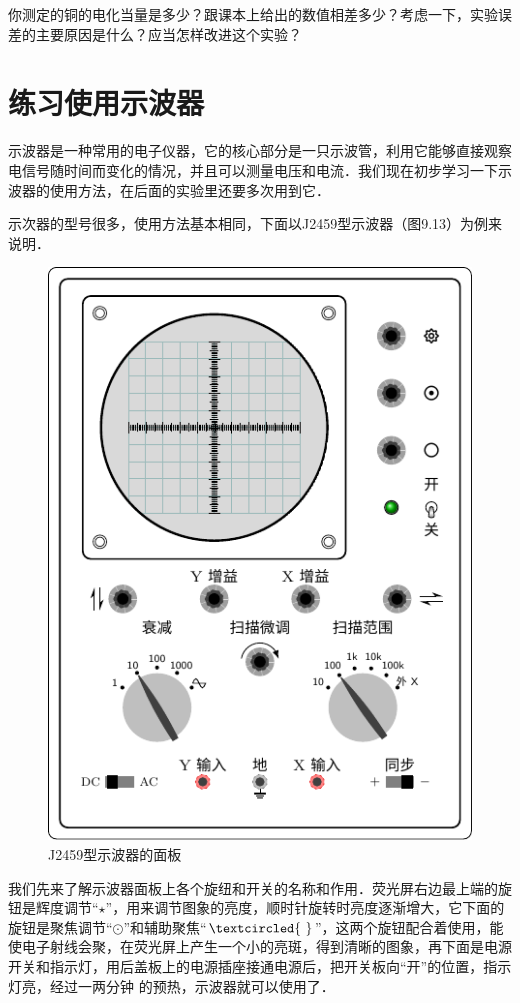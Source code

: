 你测定的铜的电化当量是多少？跟课本上给出的数值相差多少？考虑一下，实验误差的主要原因是什么？应当怎样改进这个实验？

\section{练习使用示波器}
示波器是一种常用的电子仪器，它的核心部分是一只示波管，利用它能够直接观察电信号随时间而变化的情况，并且可以测量电压和电流．我们现在初步学习一下示波器的使用方法，在后面的实验里还要多次用到它．

示次器的型号很多，使用方法基本相同，下面以J2459型示波器（图9.13）为例来说明．
\begin{figure}[htbp]
    \centering
    \includegraphics{fig/B/9-13.pdf}
    \caption{J2459型示波器的面板}\label{fig_B_9-13}
\end{figure}

我们先来了解示波器面板上各个旋纽和开关的名称和作用．荧光屏右边最上端的旋钮是辉度调节“$\star$”，用来调节图象的亮度，顺时针旋转时亮度逐渐增大，它下面的旋钮是聚焦调节“$\odot$”和辅助聚焦“$\textcircled{~}$”，这两个旋钮配合着使用，能使电子射线会聚，在荧光屏上产生一个小的亮斑，得到清晰的图象，再下面是电源开关和指示灯，用后盖板上的电源插座接通电源后，把开关板向“开”的位置，指示灯亮，经过一两分钟
的预热，示波器就可以使用了．

